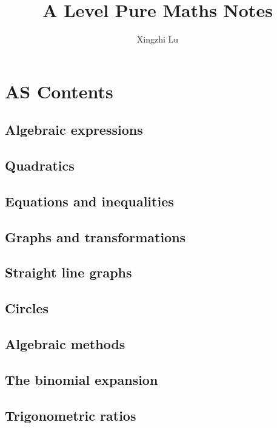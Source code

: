 \documentclass[oneside,fleqn,11pt]{book}
\title{A Level Pure Maths Notes}
\author{Xingzhi Lu}
\begin{document}
\maketitle
\everymath{\displaystyle}

\part{AS Contents}
\chapter{Algebraic expressions}


\chapter{Quadratics}


\chapter{Equations and inequalities}


\chapter{Graphs and transformations}


\chapter{Straight line graphs}


\chapter{Circles}


\chapter{Algebraic methods}


\chapter{The binomial expansion}


\chapter{Trigonometric ratios}

\end{document}
